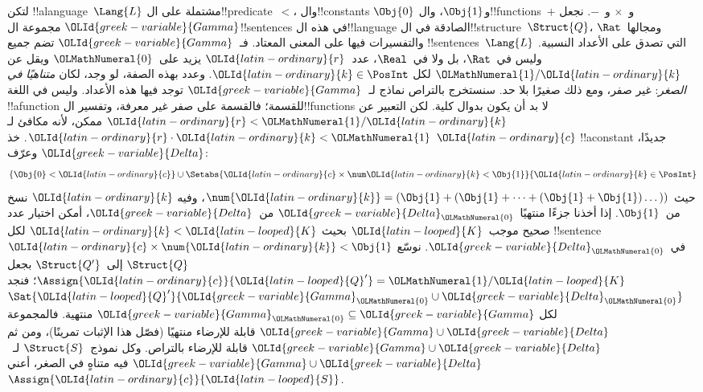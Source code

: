 \documentclass[../../../include/open-logic-section]{subfiles}
\begin{document}
{\begin{ex}
لتكن !!a{language}~$\Lang{L}$ مشتملة على ال!!{predicate}~$<$،
وال!!{constant}s $\Obj{0}$ و$\Obj{1}$، وال!!{function}s~$+$ و~$\times$
و~$-$. نجعل $\OLId{greek-variable}{Gamma}$ مجموعة ال!!{sentence}s في هذه ال!!{language}
الصادقة في ال!!{structure}~$\Struct{Q}$، ومجالها~$\Rat$ والتفسيرات
فيها على المعنى المعتاد. فـ~$\OLId{greek-variable}{Gamma}$ تضم جميع
!!{sentence}s~$\Lang{L}$ التي تصدق على الأعداد النسبية. وليس
في~$\Rat$، بل ولا في~$\Real$، عدد~$\OLId{latin-ordinary}{r}$ يزيد على~$\OLMathNumeral{0}$ ويقل عن
$\OLMathNumeral{1}/\OLId{latin-ordinary}{k}$ لكل $\OLId{latin-ordinary}{k} \in \PosInt$. وعدد بهذه الصفة، لو وجد، لكان
\emph{متناهيًا في الصغر}: غير صفر، ومع ذلك صغيرًا بلا حد.
سنستخرج بالتراص نماذج لـ~$\OLId{greek-variable}{Gamma}$ توجد فيها هذه الأعداد.
وليس في اللغة !!a{function} للقسمة؛ فالقسمة على صفر غير معرفة،
وتفسير ال!!{function}s لا بد أن يكون بدوال كلية. لكن التعبير عن
$\OLId{latin-ordinary}{r} < \OLMathNumeral{1}/\OLId{latin-ordinary}{k}$ ممكن، لأنه مكافئ لـ$\OLId{latin-ordinary}{r} \cdot \OLId{latin-ordinary}{k} < \OLMathNumeral{1}$. خذ $\OLId{latin-ordinary}{c}$
!!a{constant} جديدًا، وعرّف $\OLId{greek-variable}{Delta}$:
\[
\{\Obj{0} < \OLId{latin-ordinary}{c}\}
\cup \Setabs{ \OLId{latin-ordinary}{c} \times \num \OLId{latin-ordinary}{k} < \Obj{1} }{\OLId{latin-ordinary}{k} \in \PosInt}
\]
حيث $\num{\OLId{latin-ordinary}{k}} = (\Obj{1} + (\Obj{1} + \dots + (\Obj{1} +
\Obj{1})\dots))$، وفيه $\OLId{latin-ordinary}{k}$ نسخ من~$\Obj{1}$. إذا أخذنا جزءًا
منتهيًا~$\OLId{greek-variable}{Delta}_\OLMathNumeral{0}$ من~$\OLId{greek-variable}{Delta}$، أمكن اختيار عدد صحيح موجب~$\OLId{latin-looped}{K}$
بحيث $\OLId{latin-ordinary}{k} < \OLId{latin-looped}{K}$ لكل !!{sentence}~$\OLId{latin-ordinary}{c} \times \num{\OLId{latin-ordinary}{k}} < \Obj{1}$
في~$\OLId{greek-variable}{Delta}_\OLMathNumeral{0}$. نوسّع $\Struct{Q}$ إلى~$\Struct{Q'}$ بجعل
$\Assign{\OLId{latin-ordinary}{c}}{\OLId{latin-looped}{Q}'} = \OLMathNumeral{1}/\OLId{latin-looped}{K}$؛ فنجد $\Sat{\OLId{latin-looped}{Q}'}{\OLId{greek-variable}{Gamma}_\OLMathNumeral{0} \cup \OLId{greek-variable}{Delta}_\OLMathNumeral{0}}$
لكل $\OLId{greek-variable}{Gamma}_\OLMathNumeral{0} \subseteq \OLId{greek-variable}{Gamma}$ منتهية. فالمجموعة $\OLId{greek-variable}{Gamma} \cup \OLId{greek-variable}{Delta}$
قابلة للإرضاء منتهيًا (فصّل هذا الإثبات تمرينًا)، ومن ثم
$\OLId{greek-variable}{Gamma} \cup \OLId{greek-variable}{Delta}$ قابلة للإرضاء بالتراص. وكل نموذج~$\Struct{S}$
لـ~$\OLId{greek-variable}{Gamma} \cup \OLId{greek-variable}{Delta}$ فيه متناهٍ في الصغر، أعني~$\Assign{\OLId{latin-ordinary}{c}}{\OLId{latin-looped}{S}}$.
\end{ex}
}{}
\end{document}
